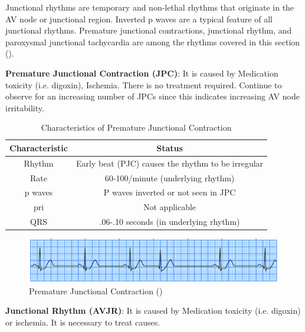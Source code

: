 Junctional rhythms are temporary and non-lethal rhythms that originate in the AV node or junctional region. Inverted p waves are a typical feature of all junctional rhythms. Premature junctional contractions, junctional rhythm, and paroxysmal junctional tachycardia are among the rhythms covered in this section (\cite{arryth_types}).


\textbf{Premature Junctional Contraction (JPC)}: It is caused by Medication toxicity (i.e. digoxin), Ischemia. There is no treatment required.
Continue to observe for an increasing number of JPCs since this indicates
increasing AV node irritability.


\begin{table}[H]
\begin{center}
\begin{tabular}{||c || c||}
 \hline
\textbf{Characteristic} & \textbf{Status} \\ [0.4ex] 
 \hline\hline
 Rhythm & Early beat (PJC) causes the rhythm to be irregular \\
\hline
Rate & 60-100/minute (underlying rhythm)\\
\hline
p waves & P waves inverted or not seen in JPC \\
\hline
pri & Not applicable \\
\hline
QRS & .06-.10 seconds (in underlying rhythm) \\
\hline\hline
\end{tabular}
\end{center}
\caption{Characteristics of Premature Junctional Contraction}
\label{table:JPC_characteristics}
\end{table}

 \begin{figure}[H]
\centering
\includegraphics[scale=0.8]{img/JPC.png}
\caption{Premature Junctional Contraction (\cite{arryth_types})}
\label{fig:JPC}
\end{figure}


\textbf{Junctional Rhythm (AVJR)}: It is caused by Medication toxicity (i.e. digoxin) or ischemia. It is necessary to treat causes.


